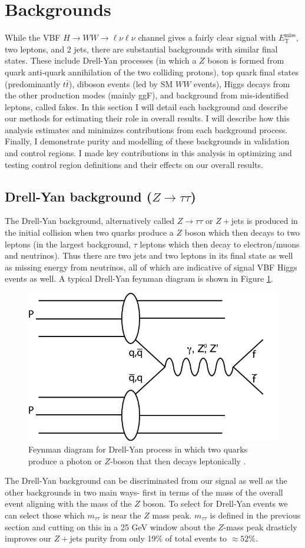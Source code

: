 \section{Backgrounds}
While the VBF $H\rightarrow WW\rightarrow \ell\nu\ell\nu$ channel gives a fairly clear signal with $E_{\text{T}}^{\text{miss}}$, two leptons, and 2 jets, there are substantial backgrounds with similar final states. These include Drell-Yan processes (in which a $Z$ boson is formed from quark anti-quark annihilation of the two colliding protons), top quark final states (predominantly $t\bar{t}$), diboson events (led by SM $WW$ events), Higgs decays from the other production modes (mainly ggF), and background from mis-identified leptons, called fakes. In this section I will detail each background and describe our methods for estimating their role in overall results. I will describe how this analysis estimates and minimizes contributions from each background process. Finally, I demonstrate purity and modelling of these backgrounds in validation and control regions. I made key contributions in this analysis in optimizing and testing control region definitions and their effects on our overall results. 

\subsection{Drell-Yan background ($Z\rightarrow \tau\tau$)}
The Drell-Yan background, alternatively called $Z\rightarrow \tau\tau$ or $Z+$jets is produced in the initial collision when two quarks produce a $Z$ boson which then decays to two leptons (in the largest background, $\tau$ leptons which then decay to electron/muons and neutrinos).  Thus there are two jets and two leptons in its final state as well as missing energy from neutrinos, all of which are indicative of signal VBF Higgs events as well. A typical Drell-Yan feynman diagram is shown in Figure \ref{fig:DrellYan}. 
\begin{figure}
\centering
  \includegraphics[width=.5\linewidth]{Pictures/FeynmanDrellYan.png}
\caption{Feynman diagram for Drell-Yan process in which two quarks produce a photon or $Z$-boson that then decays leptonically \cite{DrellYan}.}
\label{fig:DrellYan}
\end{figure}
The Drell-Yan background can be discriminated from our signal as well as the other backgrounds in two main ways- first in terms of the mass of the overall event aligning with the mass of the $Z$ boson. To select for Drell-Yan events we can select those which $m_{\tau\tau}$ is near the $Z$ mass peak. $m_{\tau\tau}$ is defined in the previous section and cutting on this in a 25 GeV window about the $Z$-mass peak drasticly improves our $Z+$jets purity from only 19$\%$ of total events to $\approx52\%$. 


